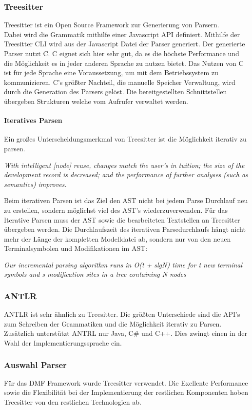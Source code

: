 \documentclass[./einleitung.tex]{subfiles}
\begin{document}
\subsubsection{Treesitter}
Treesitter ist ein Open Source Framework zur Generierung von Parsern. \\
Dabei wird die Grammatik mithilfe einer Javascript API definiert. Mithilfe der Treesitter CLI wird aus der Javascript Datei der Parser generiert. 
Der generierte Parser nutzt C. C eignet sich hier sehr gut, da es die höchste Performance und die Möglichkeit es in jeder anderen Sprache zu nutzen bietet. Das Nutzen von C ist für jede Sprache eine Voraussetzung, um mit dem Betriebssystem zu kommunizieren.
C's größter Nachteil, die manuelle Speicher Verwaltung, wird durch die Generation des Parsers gelöst. Die bereitgestellten Schnittstellen übergeben Strukturen welche vom Aufrufer verwaltet werden. 
\paragraph{Iteratives Parsen}
Ein großes Unterscheidungsmerkmal von Treesitter ist die Möglichkeit iterativ zu parsen.
\newline
 \begin{center}
 \textit{With intelligent [node] reuse, changes match the user’s in
tuition; the size of the development record is decreased; and the performance
 of further analyses (such as semantics) improves.\cite{twagner}}
 \end{center}
Beim iterativen Parsen ist das Ziel den AST nicht bei jedem Parse Durchlauf neu zu erstellen, sondern möglichst viel des AST's wiederzuverwenden. Für das Iterative Parsen muss der AST sowie die bearbeiteten Textstellen an Treesitter übergeben werden. Die Durchlaufszeit des iterativen Parsedurchlaufs hängt nicht mehr der Länge der kompletten Modelldatei ab, sondern nur von den neuen Terminalsymbolen und Modifikationen im AST:
 \newline
 \begin{center}
 \textit{Our incremental parsing algorithm runs in O(t + slgN) time for t new terminal symbols and s modification sites in a tree containing N nodes \cite{twagner}}
 \end{center}
\subsubsection{ANTLR}
ANTLR ist sehr ähnlich zu Treesitter. Die größten Unterschiede sind die API's zum Schreiben der Grammatiken und die Möglichkeit iterativ zu Parsen.
Zusätzlich unterstützt ANTRL nur Java, C\# und C++. Dies zwingt einen in der Wahl der Implementierungssprache ein. 

\subsubsection{Auswahl Parser}
Für das DMF Framework wurde Treesitter verwendet. Die Exellente Performance sowie die Flexibilität bei der Implementierung der restlichen Komponenten hoben Treesitter von den restlichen Technologien ab.
\end{document}

